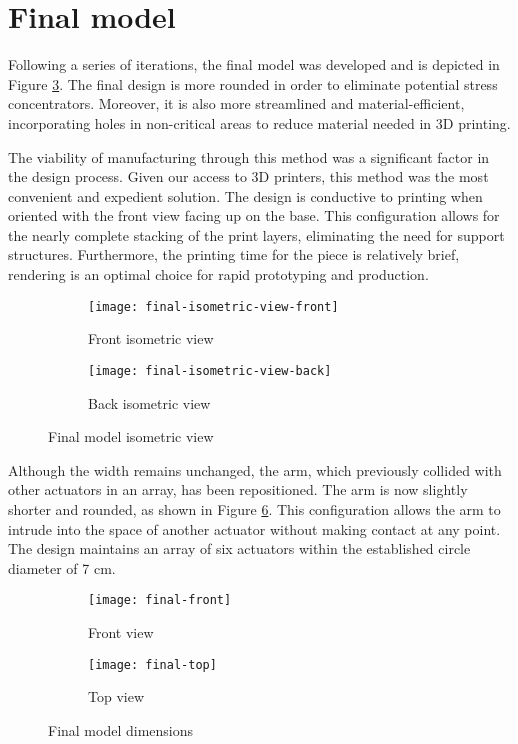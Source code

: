 \section{Final model}

Following a series of iterations, the final model was developed and is depicted in Figure \ref{fig:final-isometric-view}. The final design is more rounded in order to eliminate potential stress concentrators. Moreover, it is also more streamlined and material-efficient, incorporating holes in non-critical areas to reduce material needed in 3D printing.

The viability of manufacturing through this method was a significant factor in the design process. Given our access to 3D printers, this method was the most convenient and expedient solution. The design is conductive to printing when oriented with the front view facing up on the base. This configuration allows for the nearly complete stacking of the print layers, eliminating the need for support structures. Furthermore, the printing time for the piece is relatively brief, rendering is an optimal choice for rapid prototyping and production.

\begin{figure}
    \centering
    \begin{subfigure}[b]{0.3\textwidth}
        \texttt{[image: final-isometric-view-front]}
        \caption{Front isometric view}
        \label{fig:final-front-isometric-view}
    \end{subfigure}
    \begin{subfigure}[b]{0.3\textwidth}
        \texttt{[image: final-isometric-view-back]}
        \caption{Back isometric view}
        \label{fig:final-back-isometric-view}
    \end{subfigure}
    \caption{Final model isometric view}
    \label{fig:final-isometric-view}
\end{figure}

Although the width remains unchanged, the arm, which previously collided with other actuators in an array, has been repositioned. The arm is now slightly shorter and rounded, as shown in Figure \ref{fig:final-model-dimensions}. This configuration allows the arm to intrude into the space of another actuator without making contact at any point. The design maintains an array of six actuators within the established circle diameter of 7 cm.

\begin{figure}[H]
    \centering
    \begin{subfigure}[b]{0.316\textwidth}
        \texttt{[image: final-front]}
        \caption{Front view}
        \label{fig:final-frontal}
    \end{subfigure}
    \begin{subfigure}[b]{0.584\textwidth}
        \texttt{[image: final-top]}
        \caption{Top view}
        \label{fig:first-top}
    \end{subfigure}
    \caption{Final model dimensions}
    \label{fig:final-model-dimensions}
\end{figure}

